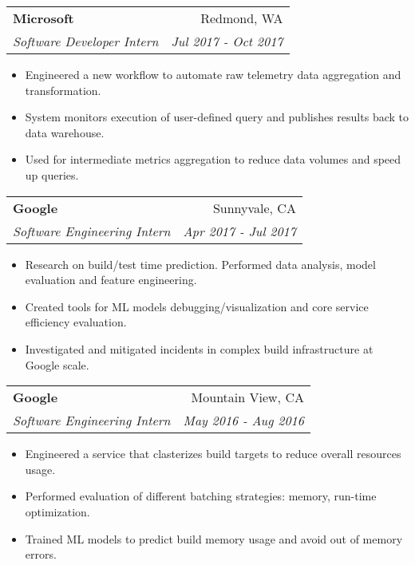 \documentclass[letterpaper,11pt]{article}
\makeatletter
\newcommand{\resumeItem}[1]{
  \item\small{
    {#1 \vspace{-2pt}}
  }
}
\newcommand{\resumeSubheading}[4]{
  \vspace{-1pt}\item
    \begin{tabular*}{0.97\textwidth}{l@{\extracolsep{\fill}}r}
      \textbf{#1} & #2 \\
      \textit{\small#3} & \textit{\small #4} \\
    \end{tabular*}\vspace{-5pt}
}
\newcommand{\resumeItemListStart}{\begin{itemize}}
\newcommand{\resumeItemListEnd}{\end{itemize}\vspace{-5pt}}
\makeatother
\begin{document}
    \resumeSubheading
      {Microsoft}{Redmond, WA}
      {Software Developer Intern}{Jul 2017 - Oct 2017}
      \resumeItemListStart
        \resumeItem{Engineered a new workflow to automate raw telemetry data aggregation and transformation.}
        \resumeItem{System monitors execution of user-defined query and publishes results back to data warehouse.}
        \resumeItem{Used for intermediate metrics aggregation to reduce data volumes and speed up queries.}
      \resumeItemListEnd

    \resumeSubheading
      {Google}{Sunnyvale, CA}
      {Software Engineering Intern}{Apr 2017 - Jul 2017}
      \resumeItemListStart
        \resumeItem{Research on build/test time prediction. Performed data analysis, model evaluation and feature engineering.}
        \resumeItem{Created tools for ML models debugging/visualization and core service efficiency evaluation.}
        \resumeItem{Investigated and mitigated incidents in complex build infrastructure at Google scale.}
      \resumeItemListEnd

    \resumeSubheading
      {Google}{Mountain View, CA}
      {Software Engineering Intern}{May 2016 - Aug 2016}
      \resumeItemListStart
        \resumeItem{Engineered a service that clasterizes build targets to reduce overall resources usage.}
        \resumeItem{Performed evaluation of different batching strategies: memory, run-time optimization.}
        \resumeItem{Trained ML models to predict build memory usage and avoid out of memory errors.}
      \resumeItemListEnd
\end{document}
